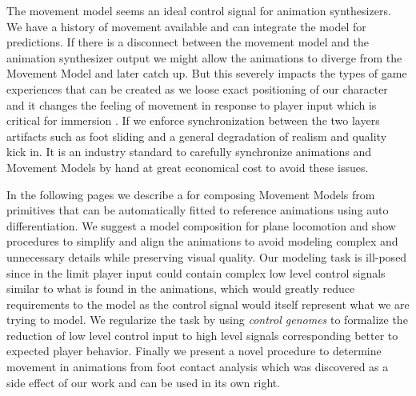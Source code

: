 The movement model seems an ideal control signal for animation synthesizers. We have a history of movement available and can integrate the model for predictions. If there is a disconnect between the movement model and the animation synthesizer output we might allow the animations to diverge from the Movement Model and later catch up. But this severely impacts the types of game experiences that can be created as we loose exact positioning of our character and it changes the feeling of movement in response to player input which is critical for immersion . If we enforce synchronization between the two layers artifacts such as foot sliding and a general degradation of realism and quality kick in. It is an industry standard to carefully synchronize animations and Movement Models by hand at great economical cost to avoid these issues. 


In the following pages we describe a  for composing Movement Models from primitives that can be automatically fitted to reference animations using auto differentiation. We suggest a model composition for plane locomotion and show procedures to simplify and align the animations to avoid modeling complex and unnecessary details while preserving visual quality. Our modeling task is ill-posed since in the limit player input could contain complex low level control signals similar to what is found in the animations, which would greatly reduce requirements to the model as the control signal would itself represent what we are trying to model. We regularize the task by using  \textit{control genomes} to formalize the reduction of low level control input to high level signals corresponding better to expected player behavior. Finally we present a novel procedure to determine movement in animations from foot contact analysis which was discovered as a side effect of our work and can be used in its own right.

